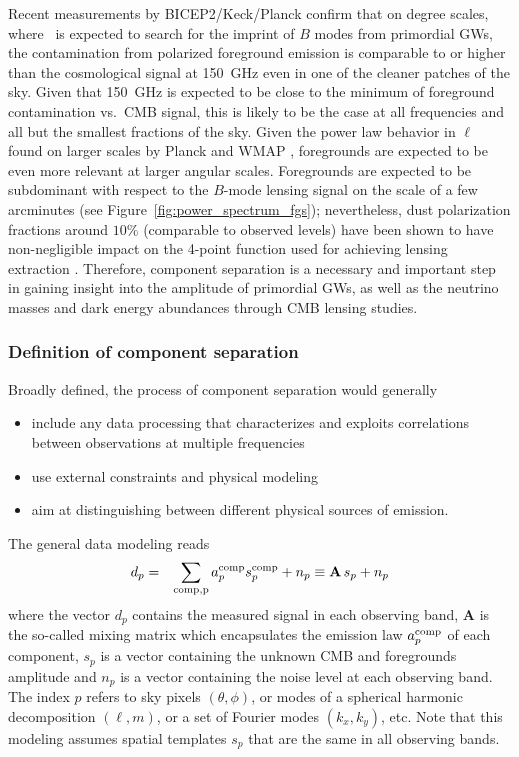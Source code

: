 Recent measurements by BICEP2/Keck/Planck \cite{bicepkeckplanck15} confirm that on degree scales, where 
\cmbexp\ is expected to search for 
the imprint of $B$ modes from primordial GWs, the contamination from polarized foreground emission is  comparable to or higher than the cosmological signal at 150~GHz even in one of the cleaner patches of the sky.
Given that 150~GHz is expected to be close to the minimum of foreground contamination vs.~CMB signal, this 
is likely to be the case at all frequencies and all but the smallest fractions of the sky.
Given the power law behavior in $\ell$ found on larger scales by Planck and WMAP \cite{planck15-9,page07}, foregrounds are expected to be even more relevant at larger angular scales. Foregrounds are expected to be subdominant  with respect to the $B$-mode lensing signal on the scale of a few arcminutes (see Figure~\ref{fig:power_spectrum_fgs}); nevertheless, dust polarization fractions around $10\%$ (comparable to observed levels) have been shown to have non-negligible impact on the 4-point function used for achieving lensing extraction \cite{fantaye12}. Therefore, component separation is a necessary and important step in gaining insight into the amplitude of primordial GWs, as well as the neutrino masses and dark energy abundances through CMB lensing studies.%

\subsubsection{Definition of component separation}

Broadly defined, the process of component separation would generally
\begin{itemize}
	\item include any data processing that characterizes and exploits correlations between observations at multiple frequencies
	\item use external constraints and physical modeling
	\item aim at distinguishing between different physical sources of emission.
\end{itemize}

The general data modeling reads
\begin{eqnarray}
	\centering	
		d_p &=& \sum_{\rm comp, p} a_p^{\rm comp} s^{\rm comp}_p + n_p \equiv \mathbf{A}\,s_p + n_p
	\label{eq:comp_sep_data_modeling}
\end{eqnarray}
where the vector $d_p$ contains the measured signal in each observing band, $\mathbf{A}$ is the so-called mixing matrix which encapsulates the emission law $a_p^{\rm comp}$ of each component, $s_p$ is a vector containing the unknown CMB and foregrounds amplitude and $n_p$ is a vector containing the noise level at each observing band. The index $p$ refers to sky pixels $\left( \theta, \phi \right)$, or modes of a spherical harmonic decomposition $\left( \ell, m\right)$, or a set of Fourier modes $\left(k_x,k_y\right)$, etc. Note that this modeling assumes spatial templates $s_p$ that are the same in all observing bands.

